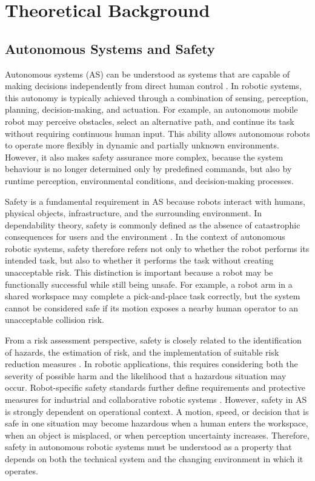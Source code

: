 \chapter{Theoretical Background}


\section{Autonomous Systems and Safety}

{\small

Autonomous systems (AS) can be understood as systems that are capable of making decisions independently from direct human control \cite{osborne2022decisionmaking}. In robotic systems, this autonomy is typically achieved through a combination of sensing, perception, planning, decision-making, and actuation. For example, an autonomous mobile robot may perceive obstacles, select an alternative path, and continue its task without requiring continuous human input. This ability allows autonomous robots to operate more flexibly in dynamic and partially unknown environments. However, it also makes safety assurance more complex, because the system behaviour is no longer determined only by predefined commands, but also by runtime perception, environmental conditions, and decision-making processes.

Safety is a fundamental requirement in AS because robots interact with humans, physical objects, infrastructure, and the surrounding environment. In dependability theory, safety is commonly defined as the absence of catastrophic consequences for users and the environment \cite{avizienis2004dependability}. In the context of autonomous robotic systems, safety therefore refers not only to whether the robot performs its intended task, but also to whether it performs the task without creating unacceptable risk. This distinction is important because a robot may be functionally successful while still being unsafe. For example, a robot arm in a shared workspace may complete a pick-and-place task correctly, but the system cannot be considered safe if its motion exposes a nearby human operator to an unacceptable collision risk.

From a risk assessment perspective, safety is closely related to the identification of hazards, the estimation of risk, and the implementation of suitable risk reduction measures \cite{iso12100}. In robotic applications, this requires considering both the severity of possible harm and the likelihood that a hazardous situation may occur. Robot-specific safety standards further define requirements and protective measures for industrial and collaborative robotic systems \cite{iso10218_1_2025,iso10218_2_2025,iso15066}. However, safety in AS is strongly dependent on operational context. A motion, speed, or decision that is safe in one situation may become hazardous when a human enters the workspace, when an object is misplaced, or when perception uncertainty increases. Therefore, safety in autonomous robotic systems must be understood as a property that depends on both the technical system and the changing environment in which it operates.

}

